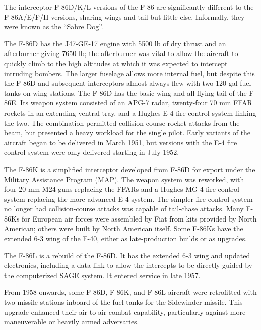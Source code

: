 The interceptor F-86D/K/L versions of the F-86 are significantly different to the F-86A/E/F/H versions, sharing wings and tail but little else. Informally, they were known as the “Sabre Dog”.

The F-86D has the J47-GE-17 engine with 5500 lb of dry thrust and an afterburner giving 7650 lb; the afterburner was vital to allow the aircraft to quickly climb to the high altitudes at which it was expected to intercept intruding bombers. The larger fuselage allows more internal fuel, but despite this the F-86D and subsequent interceptors almost always flew with two 120 gal fuel tanks on wing stations. The F-86D has the basic wing and all-flying tail of the F-86E. Its weapon system consisted of an APG-7 radar, twenty-four 70 mm FFAR rockets in an extending ventral tray, and a Hughes E-4 fire-control system linking the two. The combination permitted collision-course rocket attacks from the beam, but presented a heavy workload for the single pilot. Early variants of the aircraft began to be delivered in March 1951, but versions with the E-4 fire control system were only delivered starting in July 1952.

The F-86K is a simplified interceptor developed from F-86D for export under the Military Assistance Program (MAP). The weapon system was reworked, with four 20 mm M24 guns replacing the FFARs and a Hughes MG-4 fire-control system replacing the more advanced E-4 system. The simpler fire-control system no longer had collision-course attacks was capable of tail-chase attacks. Many F-86Ks for European air forces were assembled by Fiat from kits provided by North American; others were built by North American itself. Some F-86Ks have the extended 6-3 wing of the F-40, either as late-production builds or as upgrades. 

The F-86L is a rebuild of the F-86D. It has the extended 6-3 wing and updated electronics, including a data link to allow the  intercepts to be directly guided by the computerized SAGE system. It entered service in late 1957.

From 1958 onwards, some F-86D, F-86K, and F-86L aircraft were retrofitted with two missile stations inboard of the fuel tanks for the Sidewinder missile. This upgrade enhanced their air-to-air combat capability, particularly against more maneuverable or heavily armed adversaries.


